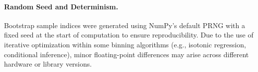 \documentclass[11pt]{article}
\begin{document}
\paragraph{Random Seed and Determinism.} Bootstrap sample indices were generated using NumPy's default PRNG with a fixed seed at the start of computation to ensure reproducibility. Due to the use of iterative optimization within some binning algorithms (e.g., isotonic regression, conditional inference), minor floating-point differences may arise across different hardware or library versions.




\end{document}
